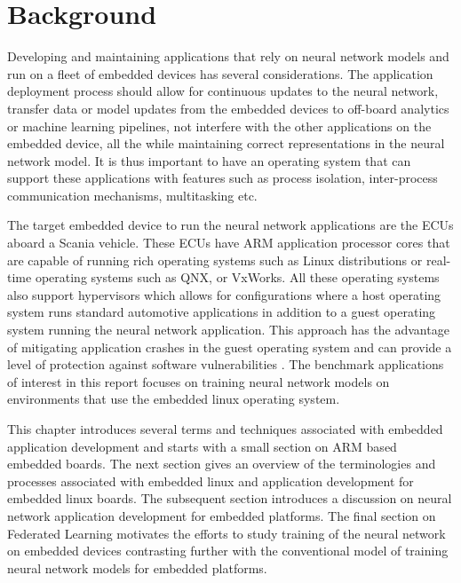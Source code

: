 
\chapter{Background}

Developing and maintaining applications that rely on neural network models and run on a fleet of embedded devices has several considerations. The application deployment process should allow for continuous updates to the neural network, transfer data or model updates from the embedded devices to off-board analytics or machine learning pipelines, not interfere with the other applications on the embedded device, all the while maintaining correct representations in the neural network model. It is thus important to have an operating system that can support these applications with features such as process isolation, inter-process communication mechanisms, multitasking etc.

The target embedded device to run the neural network applications are the ECUs aboard a Scania vehicle. These ECUs have ARM application processor cores that are capable of running rich operating systems such as Linux distributions or real-time operating systems such as QNX, or VxWorks. All these operating systems also support hypervisors which allows for configurations where a host operating system runs standard automotive applications in addition to a guest operating system running the neural network application. This approach has the advantage of mitigating application crashes in the guest operating system and can provide a level of protection against software vulnerabilities \cite{Linux-guest-os}. The benchmark applications of interest in this report focuses on training neural network models on environments that use the embedded linux operating system.

This chapter introduces several terms and techniques associated with embedded application development and starts with a small section on ARM based embedded boards. The next section gives an overview of the terminologies and processes associated with embedded linux and application development for embedded linux boards. The subsequent section introduces a discussion on neural network application development for embedded platforms. The final section on Federated Learning motivates the efforts to study training of the neural network on embedded devices contrasting further with the conventional model of training neural network models for embedded platforms.

